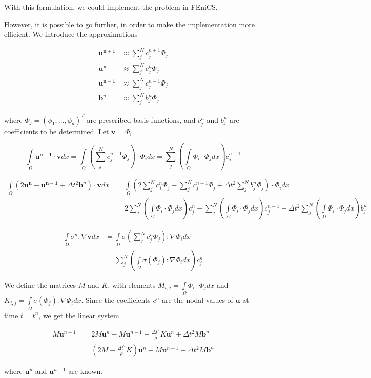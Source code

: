 \documentclass[twoside]{article}
\newcommand{\dtt}{\Delta t^2}
\newcommand{\unp}{\mathbf{u^{n+1}}}
\newcommand{\un}{\mathbf{u^{n}}}
\newcommand{\unm}{\mathbf{u^{n-1}}}
\newcommand{\io}{\int\limits_\Omega}
\newcommand{\sumjn}{\sum^N_j}
\begin{document}
With this formulation, we could implement the problem in FEniCS.

However, it is possible to go further, in order to make the implementation more efficient. We introduce the approximations

\begin{align}
\unp &\approx \sumjn c_j^{n+1}\Phi_j \\
\un &\approx \sumjn c_j^{n}\Phi_j \\
\unm &\approx \sumjn c_j^{n-1}\Phi_j \\
\mathbf{b}^n &\approx \sumjn b_j^{n}\Phi_j
\end{align}

where $\Phi_j = (\phi_1,...,\phi_d)^T$ are prescribed basis functions, and $c_j^{n}$ and $b_j^{n}$ are coefficients to be determined. Let $\mathbf{v} = \Phi_i$.

\begin{equation}
\io\unp \cdot \mathbf{v} dx = \io\left(\sumjn c_j^{n+1}\Phi_j\right)\cdot\Phi_i dx = \sumjn\left(\io \Phi_i\cdot\Phi_j dx\right)c_j^{n+1}
\end{equation}

\begin{align}
\io (2\un - \unm  + \dtt \mathbf{b}^n) \cdot \mathbf{v} dx &= \io \left(2 \sumjn c_j^{n}\Phi_j - \sumjn c_j^{n-1}\Phi_j + \dtt \sumjn b_j^{n}\Phi_j \right) \cdot\Phi_i dx\\
&= 2 \sumjn \left(\io \Phi_i \cdot\Phi_j dx\right)c_j^{n} - \sumjn \left(\io \Phi_i\cdot \Phi_j dx\right)c_j^{n-1} + \dtt \sumjn \left(\io \Phi_i \cdot\Phi_j dx\right)b_j^{n}
\end{align}

\begin{align*}
\io \sigma^n : \nabla \mathbf{v} dx &= \io \sigma(\sumjn c_j^{n}\Phi_j) : \nabla \Phi_i dx \\
&= \sumjn \left(\io \sigma(\Phi_j) : \nabla\Phi_i dx\right)c_j^{n}
\end{align*}

We define the matrices $M$ and $K$, with elements $M_{i,j} = \io \Phi_i \cdot \Phi_j dx$ and $K_{i,j} = \io \sigma(\Phi_j) : \nabla\Phi_i dx$. Since the coefficients $c^{n}$ are the nodal values of $\mathbf{u}$ at time $t=t^n$, we get the linear system

\begin{align}
M\mathbf{u}^{n+1} &= 2 M\mathbf{u}^{n} - M\mathbf{u}^{n-1} - \frac{\dtt}{\rho}K\mathbf{u}^{n} + \dtt M\mathbf{b}^n   \\
&= \left(2 M - \frac{\dtt}{\rho}K\right)\mathbf{u}^n - M\mathbf{u}^{n-1} + \dtt M\mathbf{b}^n
\end{align}

where $\mathbf{u}^{n}$ and $\mathbf{u}^{n-1}$ are known.
\end{document}
